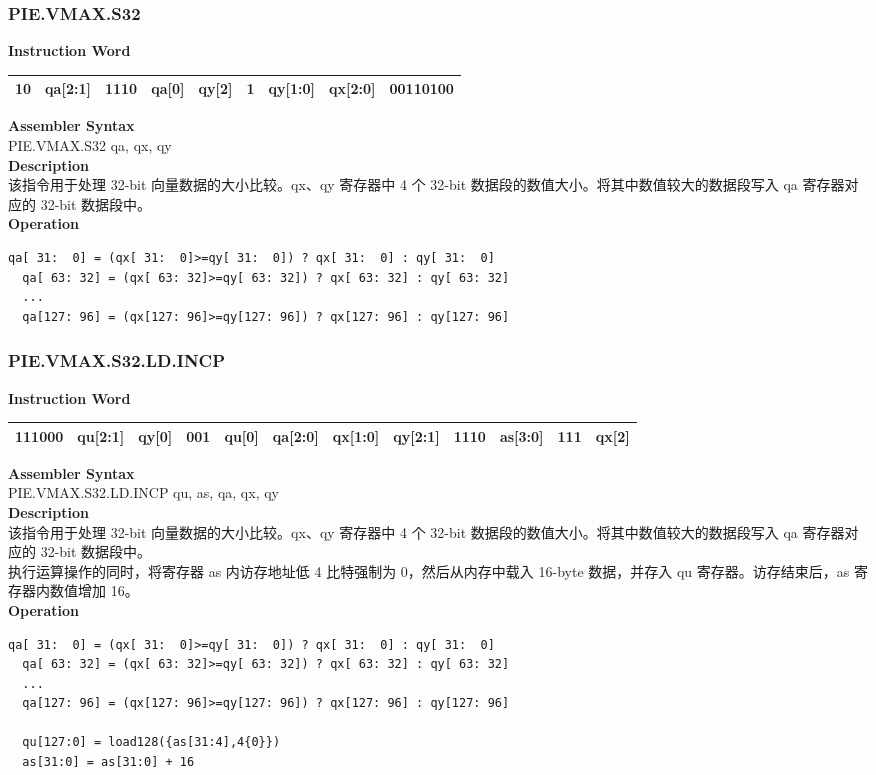 \newpage
\subsubsection{PIE.VMAX.S32}\label{instruction:PIEVMAXS32}
\setlength\tabcolsep{6pt}
\textbf{Instruction Word} \\
\begin{tabular}{|c|c|c|c|c|c|c|c|c|}
	\hline
	10 & qa[2:1] & 1110 & qa[0] & qy[2] & 1 & qy[1:0] & qx[2:0] & 00110100 \\
	\hline
\end{tabular}

\textbf{Assembler Syntax} \\
PIE.VMAX.S32 qa, qx, qy \\
\textbf{Description} \\
该指令用于处理 32-bit 向量数据的大小比较。qx、qy 寄存器中 4 个 32-bit 数据段的数值大小。将其中数值较大的数据段写入 qa 寄存器对应的 32-bit 数据段中。\\
\textbf{Operation}
\begin{lstlisting}[escapeinside=`?]
  qa[ 31:  0] = (qx[ 31:  0]>=qy[ 31:  0]) ? qx[ 31:  0] : qy[ 31:  0]
  qa[ 63: 32] = (qx[ 63: 32]>=qy[ 63: 32]) ? qx[ 63: 32] : qy[ 63: 32]
  ...
  qa[127: 96] = (qx[127: 96]>=qy[127: 96]) ? qx[127: 96] : qy[127: 96]
\end{lstlisting}

\newpage
\subsubsection{PIE.VMAX.S32.LD.INCP}\label{instruction:PIEVMAXS32LDINCP}
\setlength\tabcolsep{6pt}
\textbf{Instruction Word} \\
\begin{tabular}{|c|c|c|c|c|c|c|c|c|c|c|c|}
	\hline
	111000 & qu[2:1] & qy[0] & 001 & qu[0] & qa[2:0] & qx[1:0] & qy[2:1] & 1110 & as[3:0] & 111 & qx[2] \\
	\hline
\end{tabular}

\textbf{Assembler Syntax} \\
PIE.VMAX.S32.LD.INCP qu, as, qa, qx, qy \\
\textbf{Description} \\
该指令用于处理 32-bit 向量数据的大小比较。qx、qy 寄存器中 4 个 32-bit 数据段的数值大小。将其中数值较大的数据段写入 qa 寄存器对应的 32-bit 数据段中。\\
执行运算操作的同时，将寄存器 as 内访存地址低 4 比特强制为 0，然后从内存中载入 16-byte 数据，并存入 qu 寄存器。访存结束后，as 寄存器内数值增加 16。\\
\textbf{Operation}
\begin{lstlisting}[escapeinside=`?]
  qa[ 31:  0] = (qx[ 31:  0]>=qy[ 31:  0]) ? qx[ 31:  0] : qy[ 31:  0]
  qa[ 63: 32] = (qx[ 63: 32]>=qy[ 63: 32]) ? qx[ 63: 32] : qy[ 63: 32]
  ...
  qa[127: 96] = (qx[127: 96]>=qy[127: 96]) ? qx[127: 96] : qy[127: 96]

  qu[127:0] = load128({as[31:4],4{0}})
  as[31:0] = as[31:0] + 16
\end{lstlisting}

